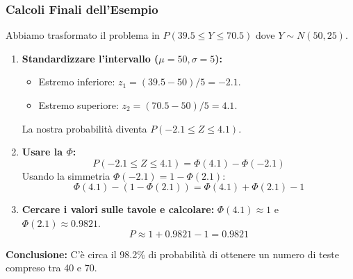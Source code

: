 \documentclass[a4paper, 11pt]{article}
\theoremstyle{definition}
\begin{document}
\subsubsection*{Calcoli Finali dell'Esempio}
Abbiamo trasformato il problema in $P(39.5 \le Y \le 70.5)$ dove $Y \sim N(50, 25)$.
\begin{enumerate}
    \item \textbf{Standardizzare l'intervallo ($\mu=50, \sigma=5$):}
    \begin{itemize}
        \item Estremo inferiore: $z_1 = (39.5 - 50) / 5 = -2.1$.
        \item Estremo superiore: $z_2 = (70.5 - 50) / 5 = 4.1$.
    \end{itemize}
    La nostra probabilità diventa $P(-2.1 \le Z \le 4.1)$.

    \item \textbf{Usare la $\Phi$:}
    \[ P(-2.1 \le Z \le 4.1) = \Phi(4.1) - \Phi(-2.1) \]
    Usando la simmetria $\Phi(-2.1) = 1 - \Phi(2.1)$:
    \[ \Phi(4.1) - (1 - \Phi(2.1)) = \Phi(4.1) + \Phi(2.1) - 1 \]

    \item \textbf{Cercare i valori sulle tavole e calcolare:}
    $\Phi(4.1) \approx 1$ e $\Phi(2.1) \approx 0.9821$.
    \[ P \approx 1 + 0.9821 - 1 = 0.9821 \]
\end{enumerate}
\textbf{Conclusione:} C'è circa il 98.2\% di probabilità di ottenere un numero di teste compreso tra 40 e 70.
\end{document}
